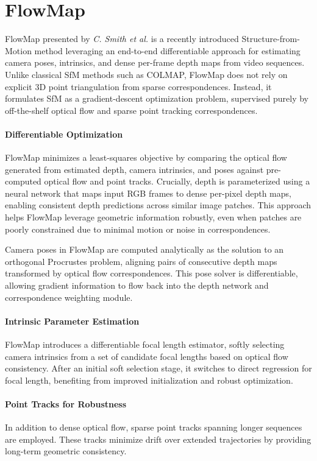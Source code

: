 \section{FlowMap}\label{sec:flowmap}
FlowMap \cite{smith24flowmap} presented by \textit{C. Smith et al.} is a recently introduced Structure-from-Motion method leveraging an end-to-end differentiable approach for estimating camera poses, intrinsics, and dense per-frame depth maps from video sequences. 
Unlike classical SfM methods such as COLMAP, FlowMap does not rely on explicit 3D point triangulation from sparse correspondences. 
Instead, it formulates SfM as a gradient-descent optimization problem, supervised purely by off-the-shelf optical flow and sparse point tracking correspondences.

\paragraph{Differentiable Optimization}
FlowMap minimizes a least-squares objective by comparing the optical flow generated from estimated depth, camera intrinsics, and poses against pre-computed optical flow and point tracks. 
Crucially, depth is parameterized using a neural network that maps input RGB frames to dense per-pixel depth maps, enabling consistent depth predictions across similar image patches. 
This approach helps FlowMap leverage geometric information robustly, even when patches are poorly constrained due to minimal motion or noise in correspondences.

Camera poses in FlowMap are computed analytically as the solution to an orthogonal Procrustes problem, aligning pairs of consecutive depth maps transformed by optical flow correspondences. 
This pose solver is differentiable, allowing gradient information to flow back into the depth network and correspondence weighting module.

\paragraph{Intrinsic Parameter Estimation}
FlowMap introduces a differentiable focal length estimator, softly selecting camera intrinsics from a set of candidate focal lengths based on optical flow consistency. 
After an initial soft selection stage, it switches to direct regression for focal length, benefiting from improved initialization and robust optimization.

\paragraph{Point Tracks for Robustness}
In addition to dense optical flow, sparse point tracks spanning longer sequences are employed. 
These tracks minimize drift over extended trajectories by providing long-term geometric consistency.

